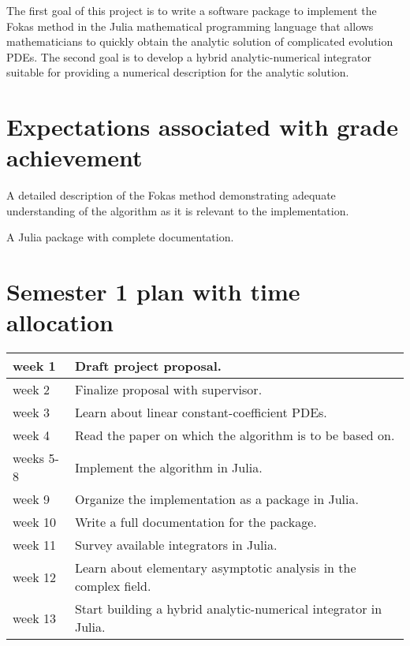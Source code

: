 \documentclass[11pt, oneside, a4paper]{article}
\begin{document}
The first goal of this project is to write a software package to implement the Fokas method in the Julia mathematical programming language that allows mathematicians to quickly obtain the analytic solution of complicated evolution PDEs. The second goal is to develop a hybrid analytic-numerical integrator suitable for providing a numerical description for the analytic solution.

\section{Expectations associated with grade achievement}

A detailed description of the Fokas method demonstrating adequate understanding of the algorithm as it is relevant to the implementation.

\noindent A Julia package with complete documentation.

\section{Semester 1 plan with time allocation}

\begin{center}
    \begin{tabular}{|l|l|} 
    \hline
    week 1 & Draft project proposal. \\ 
    \hline
    week 2 & Finalize proposal with supervisor. \\ 
    \hline
    week 3 & Learn about linear constant-coefficient PDEs.\\
    \hline 
    week 4 & Read the paper on which the algorithm is to be based on.\\ 
    \hline
    weeks 5-8 & Implement the algorithm in Julia.\\
    \hline
    week 9 & Organize the implementation as a package in Julia.\\
    \hline
    week 10 & Write a full documentation for the package.\\
    \hline
    week 11 & Survey available integrators in Julia.\\
    \hline
    week 12 & Learn about elementary asymptotic analysis in the complex field.\\
    \hline
    week 13 & Start building a hybrid analytic-numerical integrator in Julia.\\
    \hline
    \end{tabular}
    \end{center}
\end{document}
